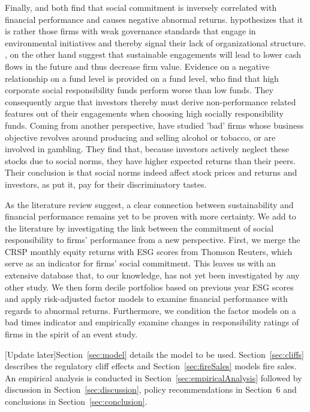\documentclass[11pt]{article}
\begin{document}
Finally, \citet{Fisher-Vanden2011} and \citet{Boyle1997} both find that social commitment is inversely correlated with financial performance and causes negative abnormal returns. \citet{Fisher-Vanden2011} hypothesizes that it is rather those firms with weak governance standards that engage in environmental initiatives and thereby signal their lack of organizational structure. \citet{Boyle1997}, on the other hand suggest that sustainable engagements will lead to lower cash flows in the future and thus decrease firm value. Evidence on a negative relationship on a fund level is provided \citet{ElGhoul2017} on a fund level, who find that high corporate social responsibility funds perform worse than low funds. They consequently argue that investors thereby must derive non-performance related features out of their engagements when choosing high socially responsibility funds. Coming from another perspective, \citet{Hong2009} have studied 'bad' firms whose business objective revolves around producing and selling alcohol or tobacco, or are involved in gambling. They find that, because investors actively neglect these stocks due to social norms, they have higher expected returns than their peers. Their conclusion is that social norms indeed affect stock prices and returns and investors, as \citet{Hong2009} put it, pay for their discriminatory tastes.

As the literature review suggest, a clear connection between sustainability and financial performance remains yet to be proven with more certainty. We add to the literature by investigating the link between the commitment of social responsibility to firms’ performance from a new perspective. First, we merge the CRSP monthly equity returns with ESG scores from Thomson Reuters, which serve as an indicator for firms’ social commitment. This leaves us with an extensive database that, to our knowledge, has not yet been investigated by any other study. We then form decile portfolios based on previous year ESG scores and apply risk-adjusted factor models to examine financial performance with regards to abnormal returns. Furthermore, we condition the factor models on a bad times indicator and empirically examine changes in responsibility ratings of firms in the spirit of an event study. 


[Update later]Section~\ref{sec:model} details the model to be used. Section~\ref{sec:cliffs} describes the regulatory cliff effects and Section~\ref{sec:fireSales} models fire sales. An empirical analysis is conducted in Section~\ref{sec:empiricalAnalysis} followed by discussion in Section~\ref{sec:discussion}, policy recommendations in Section~6 and conclusions in Section~\ref{sec:conclusion}.
\end{document}
